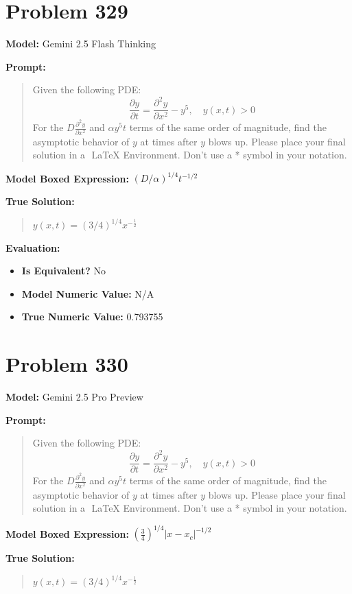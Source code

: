 \documentclass{article}
\begin{document}
{\section*{Problem 329}
\textbf{Model:} Gemini 2.5 Flash Thinking

\textbf{Prompt:}
\begin{quote}
Given the following PDE:$$\frac{\partial y}{\partial t} = \frac{\partial^2y}{\partial x^2} - y^5, \quad y(x,t)>0$$For the $D\frac{\partial^2y}{\partial x^2}$ and $ \alpha y^5 t$ terms of the same order of magnitude, find the asymptotic behavior of $y$ at times after $y$ blows up. Please place your final solution in a $\boxed{}$ LaTeX Environment. Don't use a * symbol in your notation.
\end{quote}
\textbf{Model Boxed Expression:} $(D/\alpha)^{1/4} t^{-1/2}$

\textbf{True Solution:}
\begin{quote}
$y(x,t) = (3/4)^{1/4} x^{-\frac{1}{2}}$
\end{quote}

\textbf{Evaluation:}
\begin{itemize}
\item \textbf{Is Equivalent?} No
\item \textbf{Model Numeric Value:} N/A
\item \textbf{True Numeric Value:} 0.793755
\end{itemize}
\vspace{1cm}
\section*{Problem 330}
\textbf{Model:} Gemini 2.5 Pro Preview

\textbf{Prompt:}
\begin{quote}
Given the following PDE:$$\frac{\partial y}{\partial t} = \frac{\partial^2y}{\partial x^2} - y^5, \quad y(x,t)>0$$For the $D\frac{\partial^2y}{\partial x^2}$ and $ \alpha y^5 t$ terms of the same order of magnitude, find the asymptotic behavior of $y$ at times after $y$ blows up. Please place your final solution in a $\boxed{}$ LaTeX Environment. Don't use a * symbol in your notation.
\end{quote}
\textbf{Model Boxed Expression:} $\left(\frac{3}{4}\right)^{1/4} |x-x_c|^{-1/2}$

\textbf{True Solution:}
\begin{quote}
$y(x,t) = (3/4)^{1/4} x^{-\frac{1}{2}}$
\end{quote}

}
\end{document}
